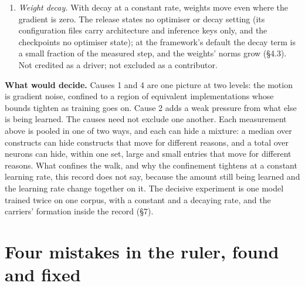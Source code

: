 \documentclass{article}
\begin{document}
\begin{enumerate}[topsep=2pt,itemsep=1pt,parsep=0pt,partopsep=0pt,leftmargin=*]
\item \emph{Weight decay.} With decay at a constant rate, weights move even where the gradient is zero. The release states no optimiser or decay setting (its configuration files carry architecture and inference keys only, and the checkpoints no optimiser state); at the framework's default the decay term is a small fraction of the measured step, and the weights' norms grow (\S4.3). Not credited as a driver; not excluded as a contributor.
\end{enumerate}

\textbf{What would decide.} Causes 1 and 4 are one picture at two levels: the motion is gradient noise, confined to a region of equivalent implementations whose bounds tighten as training goes on. Cause 2 adds a weak pressure from what else is being learned. The causes need not exclude one another. Each measurement above is pooled in one of two ways, and each can hide a mixture: a median over constructs can hide constructs that move for different reasons, and a total over neurons can hide, within one set, large and small entries that move for different reasons. What confines the walk, and why the confinement tightens at a constant learning rate, this record does not say, because the amount still being learned and the learning rate change together on it. The decisive experiment is one model trained twice on one corpus, with a constant and a decaying rate, and the carriers' formation inside the record (\S7).

\section{Four mistakes in the ruler, found and fixed}
\end{document}
